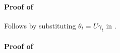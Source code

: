 \paragraph{Proof of }
Follows by substituting $\theta_t=U\gamma_t$ in .
\begin{comment}
\begin{theorem}[Lower Bound]
There exists a distribution $P$ over $\R^d\times \R^{\dcd}$ satisfying \Cref{assmp:lsa}, such that $\alpha_P>0$, such that $\rhos{P}>0$ and $\rhod{P}>0,\,\forall \alpha\in (0,\alpha_P)$ and
\begin{align*}
\EE{\norm{\thh_t-\ts}^2} &\geq \frac{1}{(t+1)^2}(\alpha)^{-2}(\rhod{P}\rhos{P})^{-1}\Big( \big(1-(1-\alpha \rhos{P})^t\big) \norm{\theta_0-\ts}^2 \\&+ \sum_{s=1}^t \big(1-(1-\alpha \rhos{P})^{(t-s)}\big) \big(\alpha^2(\sigma_A^2\norm{\ts}^2+\sigma_b^2)+\alpha (\sigma_A^2\norm{\ts})\norm{\theta_0-\ts}\big) \Big)
\end{align*}
\end{theorem}
\end{comment}
\paragraph{Proof of }


